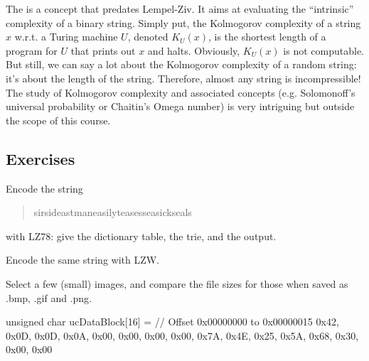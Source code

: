 The  is a concept that predates Lempel-Ziv. It aims at evaluating the ``intrinsic'' complexity of a binary string. Simply put, the Kolmogorov complexity of a string $x$ w.r.t. a Turing machine $U$, denoted $K_U(x)$, is the shortest length of a program for $U$ that prints out $x$ and halts. Obviously, $K_U(x)$ is not computable. But still, we can say a lot about the Kolmogorov complexity of a random string: it's about the length of the string. Therefore, almost any string is incompressible! The study of Kolmogorov complexity and associated concepts (e.g. Solomonoff's universal probability or Chaitin's Omega number) is very intriguing but outside the scope of this course.



 \subsection{Exercises}

\begin{exercise}
Encode the string
\begin{quote}
    sir\textvisiblespace sid\textvisiblespace eastman\textvisiblespace easily\textvisiblespace teases\textvisiblespace sea\textvisiblespace sick\textvisiblespace seals
\end{quote}
with LZ78: give the dictionary table, the trie, and the output.

Encode the same string with LZW.
\end{exercise}


\begin{exercise}
Select a few (small) images, and compare the file sizes for those when saved as .bmp, .gif and .png.
\end{exercise}














unsigned char ucDataBlock[16] = {
	// Offset 0x00000000 to 0x00000015
	0x42, 0x0D, 0x0D, 0x0A, 0x00, 0x00, 0x00, 0x00, 0x7A, 0x4E, 0x25, 0x5A,
	0x68, 0x30, 0x00, 0x00
}








